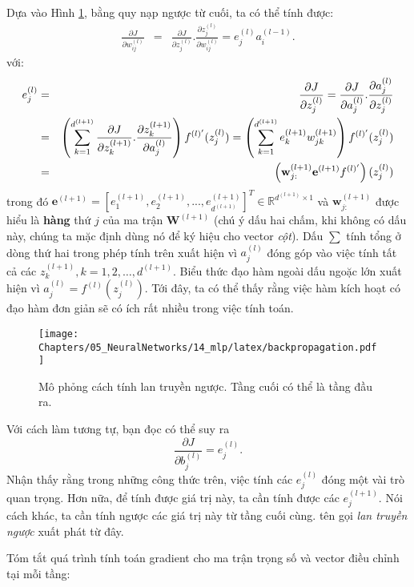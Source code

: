 Dựa vào Hình \ref{fig:14_6_2}, bằng quy nạp ngược từ cuối, ta có thể tính được:
\begin{eqnarray}
\frac{\partial J}{\partial w_{ij}^{(l)}} &=& \frac{\partial J}{\partial
z_j^{(l)}}. \frac{\partial z_j^{(l)}}{\partial w_{ij}^{(l)}} = e_j^{(l)} a_i^{(l-1)}.
\end{eqnarray}
\newpage
với:
\begin{eqnarray*}
e_j^{(l)} &=& \frac{\partial J}{\partial z_j^{(l)}} = \frac{\partial J}{\partial a_j^{(l)}} . \frac{\partial a_j^{(l)}}{\partial z_j^{(l)}} \\\
&=& \left( \sum_{k = 1}^{d^{(l+1)}} \frac{\partial J}{\partial z_k^{(l+1)}}
.\frac{\partial z_k^{(l+1)}}{\partial a_j^{(l)}} \right) f^{(l)'}(z_j^{(l)}) =\left( \sum_{k = 1}^{d^{(l+1)}} e_k^{(l+1)} w_{jk}^{(l+1)} \right)
f^{(l)'}(z_j^{(l)}) \\
&=& \left(\mathbf{w}_{j:}^{(l+1)}\mathbf{e}^{(l+1)}f^{(l)'}\right)(z_j^{(l)})
\end{eqnarray*}
trong đó $\mathbf{e}^{(l+1)} = [e_1^{(l+1)}, e_2^{(l+1)}, ...,
e_{d^{(l+1)}}^{(l+1)}]^T \in \mathbb{R}^{d^{(l+1)}\times 1} $ và
$\mathbf{w}_{j:}^{(l+1)}$ được hiểu là \textbf{hàng} thứ $j$ của ma trận
$\mathbf{W}^{(l+1)}$ (chú ý dấu hai chấm, khi không có dấu này, chúng ta mặc
định dùng nó để ký hiệu cho vector \textit{cột}).
Dấu $\sum$ tính tổng ở dòng thứ hai trong phép tính trên xuất hiện vì
$a_{j}^{(l)}$ {đóng góp} vào việc tính tất cả các $z_k^{(l+1)}, k = 1, 2,
\dots, d^{(l+1)}$. Biểu thức đạo hàm ngoài dấu ngoặc lớn xuất hiện vì $a_j^{(l)}  =
f^{(l)}(z_j^{(l)})$. Tới đây, ta có thể thấy rằng việc hàm kích hoạt có
đạo hàm đơn giản sẽ có ích rất nhiều trong việc tính toán.
\begin{figure}[t]
\centering
\texttt{[image: Chapters/05\_NeuralNetworks/14\_mlp/latex/backpropagation.pdf]}
\caption[]{Mô phỏng cách tính lan truyền ngược. Tầng cuối có thể là tầng đầu ra.}
\label{fig:14_6_2}
\end{figure}
Với cách làm tương tự, bạn đọc có thể suy ra
\begin{equation}
\frac{\partial J}{\partial b_j^{(l)}} = e_j^{(l)}.
\end{equation}
Nhận thấy rằng trong những công thức trên, việc tính các $e_j^{(l)}$ đóng một vài trò quan trọng. Hơn nữa, để tính được giá trị này, ta cần tính được các $e_j^{(l+1)}$. Nói cách khác, ta cần tính {ngược} các giá trị này từ tầng cuối cùng. tên gọi \textit{lan truyền ngược} xuất phát từ đây.

Tóm tắt quá trình tính toán gradient cho ma trận trọng số và vector điều chỉnh tại mỗi tầng:


